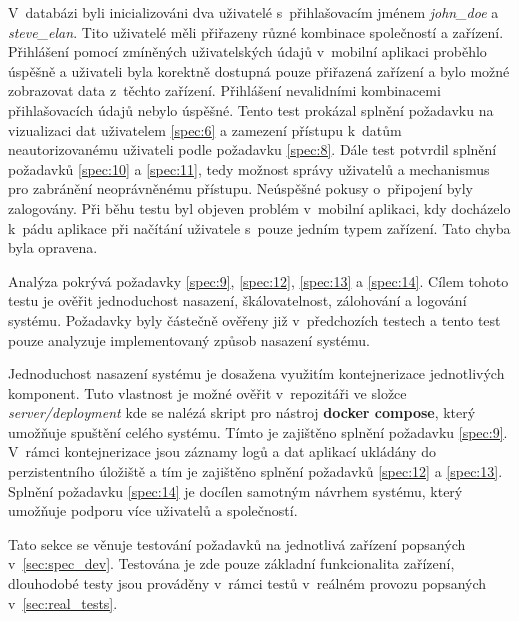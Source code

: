 V~databázi byli inicializováni dva uživatelé s~přihlašovacím jménem \textit{john\_doe} a \textit{steve\_elan}. Tito uživatelé měli přiřazeny různé kombinace společností a zařízení. Přihlášení pomocí zmíněných uživatelských údajů v~mobilní aplikaci proběhlo úspěšně a uživateli byla korektně dostupná pouze přiřazená zařízení a bylo možné zobrazovat data z~těchto zařízení. Přihlášení nevalidními kombinacemi přihlašovacích údajů nebylo úspěšné. Tento test prokázal splnění požadavku na vizualizaci dat uživatelem \ref{spec:6} a zamezení přístupu k~datům neautorizovanému uživateli podle požadavku \ref{spec:8}. Dále test potvrdil splnění požadavků \ref{spec:10} a \ref{spec:11}, tedy možnost správy uživatelů a mechanismus pro zabránění neoprávněnému přístupu. Neúspěšné pokusy o~připojení byly zalogovány. Při běhu testu byl objeven problém v~mobilní aplikaci, kdy docházelo k~pádu aplikace při načítání uživatele s~pouze jedním typem zařízení. Tato chyba byla opravena.

Analýza pokrývá požadavky \ref{spec:9}, \ref{spec:12}, \ref{spec:13} a \ref{spec:14}. Cílem tohoto testu je ověřit jednoduchost nasazení, škálovatelnost, zálohování a logování systému. Požadavky byly částečně ověřeny již v~předchozích testech a tento test pouze analyzuje implementovaný způsob nasazení systému.

Jednoduchost nasazení systému je dosažena využitím kontejnerizace jednotlivých komponent. Tuto vlastnost je možné ověřit v~repozitáři ve složce \textit{server/deployment} kde se nalézá skript pro nástroj \textbf{docker compose}, který umožňuje spuštění celého systému. Tímto je zajištěno splnění požadavku \ref{spec:9}. V~rámci kontejnerizace jsou záznamy logů a dat aplikací ukládány do perzistentního úložiště a tím je zajištěno splnění požadavků \ref{spec:12} a \ref{spec:13}. Splnění požadavku \ref{spec:14} je docílen samotným návrhem systému, který umožňuje podporu více uživatelů a společností.


Tato sekce se věnuje testování požadavků na jednotlivá zařízení popsaných v~\ref{sec:spec_dev}. Testována je zde pouze základní funkcionalita zařízení, dlouhodobé testy jsou prováděny v~rámci testů v~reálném provozu popsaných v~\ref{sec:real_tests}.

